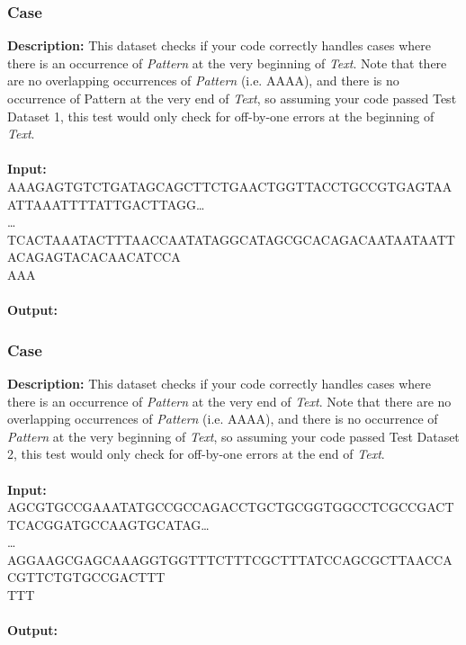 \documentclass{article}
\newcommand{\code}[1]{{\fontfamily{pcr}\selectfont #1}}
\begin{document}
\subsubsection*{Case }
\hline \vspace{5}
\textbf{Description:} This dataset checks if your code correctly handles cases where there is an occurrence of \emph{Pattern} at the very beginning of \emph{Text}. Note that there are no overlapping occurrences of \emph{Pattern} (i.e. \code{AAAA}), and there is no occurrence of Pattern at the very end of \emph{Text}, so assuming your code passed Test Dataset 1, this test would only check for off-by-one errors at the beginning of \emph{Text}.\\ \\
\noindent \textbf{Input:}\\
\code{AAAGAGTGTCTGATAGCAGCTTCTGAACTGGTTACCTGCCGTGAGTAAATTAAATTTTATTGACTTAGG\dots\\ \dots TCACTAAATACTTTAACCAATATAGGCATAGCGCACAGACAATAATAATTACAGAGTACACAACATCCA\\ AAA}\\ \\
\noindent \textbf{Output:}\\
\code{3}
\pagebreak

\subsubsection*{Case }
\hline \vspace{5}
\textbf{Description:} This dataset checks if your code correctly handles cases where there is an occurrence of \emph{Pattern} at the very end of \emph{Text}. Note that there are no overlapping occurrences of \emph{Pattern} (i.e. \code{AAAA}), and there is no occurrence of \emph{Pattern} at the very beginning of \emph{Text}, so assuming your code passed Test Dataset 2, this test would only check for off-by-one errors at the end of \emph{Text}.\\ \\
\noindent \textbf{Input:}\\
\code{AGCGTGCCGAAATATGCCGCCAGACCTGCTGCGGTGGCCTCGCCGACTTCACGGATGCCAAGTGCATAG\dots\\
\dots AGGAAGCGAGCAAAGGTGGTTTCTTTCGCTTTATCCAGCGCTTAACCACGTTCTGTGCCGACTTT\\ TTT}\\ \\
\noindent \textbf{Output:}\\
\code{4}
\end{document}
